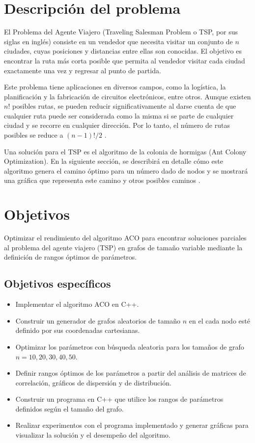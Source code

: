 \documentclass[conference]{IEEEtran}
\begin{document}
\section{Descripción del problema}

El Problema del Agente Viajero (Traveling Salesman Problem o TSP, por sus siglas en inglés) consiste en un vendedor que necesita visitar un conjunto de $n$ ciudades, cuyas posiciones y distancias entre ellas son conocidas. El objetivo es encontrar la ruta más corta posible que permita al vendedor visitar cada ciudad exactamente una vez y regresar al punto de partida.

Este problema tiene aplicaciones en diversos campos, como la logística, la planificación y la fabricación de circuitos electrónicos, entre otros. Aunque existen $n!$ posibles rutas, se pueden reducir significativamente al darse cuenta de que cualquier ruta puede ser considerada como la misma si se parte de cualquier ciudad y se recorre en cualquier dirección. Por lo tanto, el número de rutas posibles se reduce a $(n-1)!/2$ \cite{aco_youtube}.

Una solución para el TSP es el algoritmo de la colonia de hormigas (Ant Colony Optimization). En la siguiente sección, se describirá en detalle cómo este algoritmo genera el camino óptimo para un número dado de nodos y se mostrará una gráfica que representa este camino y otros posibles caminos \cite{aco_youtube}.

\section {Objetivos}
Optimizar el rendimiento del algoritmo ACO para encontrar soluciones parciales al problema del agente viajero (TSP) en grafos de tamaño variable mediante la definición de rangos óptimos de parámetros.
\subsection{Objetivos específicos}
\begin{itemize}
\item Implementar el algoritmo ACO en C++.
\item Construir un generador de grafos aleatorios de tamaño $n$ en el cada nodo esté definido por sus coordenadas cartesianas.
\item Optimizar los parámetros con búsqueda aleatoria para los tamaños de grafo $n=10, 20, 30, 40, 50$.
\item Definir rangos óptimos de los parámetros a partir del análisis de matrices de correlación, gráficos de dispersión y de distribución.
\item Construir un programa en C++ que utilice los rangos de parámetros definidos según el tamaño del grafo.
\item Realizar experimentos con el programa implementado y generar gráficas para visualizar la solución y el desempeño del algoritmo.
\end{itemize}
\end{document}

